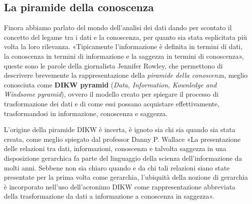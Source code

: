 \subsection{La piramide della conoscenza}
Finora abbiamo parlato del mondo dell’analisi dei dati dando per scontato il concetto del legame tra i dati e la conoscenza, per quanto sia stata esplicitata più volta la loro rilevanza. «Tipicamente l'informazione è definita in termini di dati, la conoscenza in termini di informazione e la saggezza in termini di conoscenza», queste sono le parole della giornalista Jennifer Rowley\cite{rowley_dikw_hierarchy}, che permettono di descrivere brevemente la rappresentazione della \textit{piramide della conoscenz}a, meglio conosciuta come \textbf{DIKW pyramid} (\textit{Data, Information, Kownledge and Windsome pyramid}), ovvero il modello creato per spiegare il processo di trasformazione dei dati e di come essi possano acquistare effettivamente, trasformandosi in informazione, conoscenza e saggezza.

L’origine della piramide DIKW è incerta, è ignoto sia chi sia quando sia stata creata, come meglio spiegato dal professor Danny P. Wallace\cite{knowledge_management_historical}
«La presentazione delle relazioni tra dati, informazioni, conoscenza e talvolta saggezza in una disposizione gerarchica fa parte del linguaggio della scienza dell’informazione da molti anni. Sebbene non sia chiaro quando e da chi tali relazioni siano state presentate per la prima volta come gerarchia, l’ubiquità della nozione di gerarchia è incorporato nell’uso dell’acronimo DIKW come rappresentazione abbreviata della trasformazione da dati a informazione a conoscenza in saggezza».

